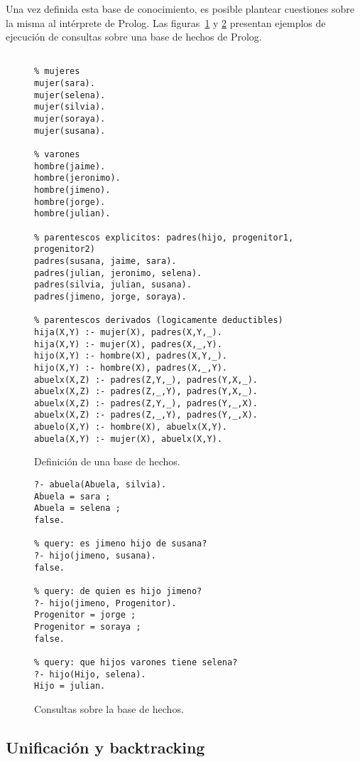 \documentclass[11pt,captions=nooneline,DIV=14, parskip=full]{scrartcl}
\begin{document}
Una vez definida esta base de conocimiento, es posible plantear cuestiones sobre la misma al intérprete de Prolog. Las figuras~\ref{fig:basehechos} y \ref{fig:queries} presentan ejemplos de ejecución de consultas sobre una base de hechos de Prolog.

\begin{figure}[p]
\lstset{language=Prolog}
\begin{lstlisting}[frame=single]
% base de hechos

% mujeres
mujer(sara).
mujer(selena).
mujer(silvia).
mujer(soraya).
mujer(susana).

% varones
hombre(jaime).
hombre(jeronimo).
hombre(jimeno).
hombre(jorge).
hombre(julian).

% parentescos explicitos: padres(hijo, progenitor1, progenitor2)
padres(susana, jaime, sara).
padres(julian, jeronimo, selena).
padres(silvia, julian, susana).
padres(jimeno, jorge, soraya).

% parentescos derivados (logicamente deductibles)
hija(X,Y) :- mujer(X), padres(X,Y,_).
hija(X,Y) :- mujer(X), padres(X,_,Y).
hijo(X,Y) :- hombre(X), padres(X,Y,_).
hijo(X,Y) :- hombre(X), padres(X,_,Y).
abuelx(X,Z) :- padres(Z,Y,_), padres(Y,X,_).
abuelx(X,Z) :- padres(Z,_,Y), padres(Y,X,_).
abuelx(X,Z) :- padres(Z,Y,_), padres(Y,_,X).
abuelx(X,Z) :- padres(Z,_,Y), padres(Y,_,X).
abuelo(X,Y) :- hombre(X), abuelx(X,Y).
abuela(X,Y) :- mujer(X), abuelx(X,Y).
\end{lstlisting} 
\caption{Definición de una base de hechos.}
\label{fig:basehechos}
\end{figure}

\begin{figure}[h]
\lstset{language=Prolog}
\begin{lstlisting}[frame=single]
% query: quien es abuela de silvia?
?- abuela(Abuela, silvia).
Abuela = sara ;
Abuela = selena ;
false.

% query: es jimeno hijo de susana?
?- hijo(jimeno, susana).
false.

% query: de quien es hijo jimeno?
?- hijo(jimeno, Progenitor).
Progenitor = jorge ;
Progenitor = soraya ;
false.

% query: que hijos varones tiene selena?
?- hijo(Hijo, selena).
Hijo = julian.
\end{lstlisting} 
\caption{Consultas sobre la base de hechos.}
\label{fig:queries}
\end{figure}

\subsection{Unificación y backtracking}
\end{document}

